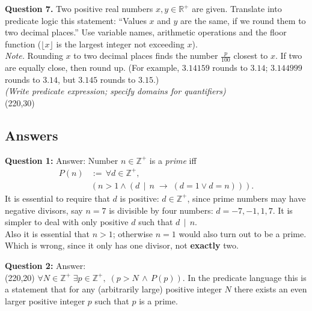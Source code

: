 \documentclass[jou]{apa6}
\begin{document}
{\bf Question 7.} 
Two positive real numbers $x,y \in \mathbb{R}^{+}$ are given. 
Translate into predicate logic this statement:
``Values $x$ and $y$ are the same, if we round them to two 
decimal places.'' Use variable names, arithmetic operations and 
the floor function ($\lfloor x \rfloor$ is the largest integer not
exceeding $x$).\\
{\em Note.} Rounding $x$ to two decimal places finds the 
number $\frac{p}{100}$ closest to $x$. 
If two are equally close, then round up.
(For example, $3.14159$ rounds to $3.14$; $3.144999$ rounds to $3.14$, 
but $3.145$ rounds to $3.15$.)\\
{\scriptsize \em (Write predicate expression; specify domains for quantifiers)}\\
\framebox(220,30){}









\newpage

\subsection{Answers}

{\bf Question 1:} Answer: Number $n \in \mathbb{Z}^{+}$ is a {\em prime} iff
\begin{align}
P(n) & :=\, \forall d \in \mathbb{Z}^{+}, \nonumber \\
 & \left( n > 1 \wedge \left( d \,\mid\, n \;\rightarrow\; (d = 1 \vee d = n) \right)\right). \nonumber
\end{align}
It is essential to require that $d$ is positive: $d \in \mathbb{Z}^{+}$, since prime numbers
may have negative divisors, say $n=7$ is divisible by four numbers: $d=-7, -1, 1, 7$. It is 
simpler to deal with only positive $d$ such that $d\,\mid\,n$.\\
Also it is essential that $n>1$; otherwise $n=1$ would also turn out to be a prime. Which is wrong, since it 
only has one divisor, not {\bf exactly} two.

\vspace{10pt}
{\bf Question 2:} Answer:\\[5pt]
\framebox(220,20){
$\forall N \in \mathbb{Z}^{+}\; \exists p \in \mathbb{Z}^{+},\;\left( p > N \,\wedge\, P(p) \right).$
}
In the predicate language this is a statement that for any (arbitrarily large) positive integer $N$ 
there exists an even larger positive integer $p$ such that $p$ is a prime. 
\end{document}
